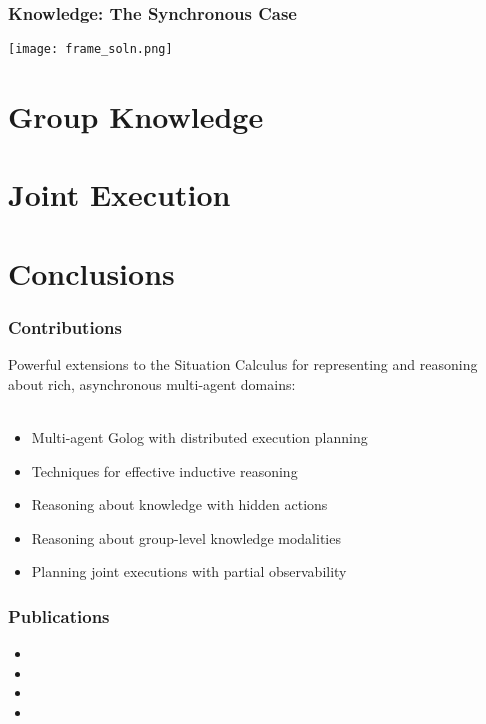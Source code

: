 \documentclass{beamer}
\begin{document}
\begin{frame}
\frametitle{Knowledge: The Synchronous Case}
\begin{center}
  \texttt{[image: frame\_soln.png]}
\end{center}
\end{frame}


\section{Group Knowledge}

\begin{frame}
\end{frame}

\section{Joint Execution}

\begin{frame}
\end{frame}

\section{Conclusions}

\begin{frame}
  \frametitle{Contributions}
  Powerful extensions to the Situation Calculus for representing and reasoning
  about rich, asynchronous multi-agent domains:
  \ \\
  \ \\
  \begin{itemize}
  \item Multi-agent Golog with distributed execution planning
  \item Techniques for effective inductive reasoning
  \item Reasoning about knowledge with hidden actions
  \item Reasoning about group-level knowledge modalities
  \item Planning joint executions with partial observability
  \end{itemize}
\end{frame}

\begin{frame}
\frametitle{Publications}
\begin{itemize}
\item {}
\item {}
\item {}
\item {}
\end{itemize}
\end{frame}

\begin{frame}

\end{frame}
\end{document}
